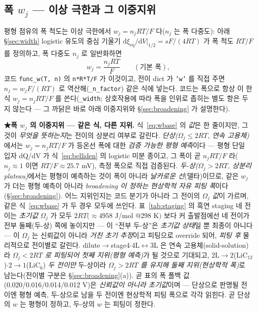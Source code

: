 \documentclass[11pt,a4paper]{article}
\newcommand{\dd}{\mathrm{d}}
\newcommand{\eq}{\mathrm{eq}}
\newcommand{\code}[1]{\texttt{#1}}
\begin{document}
\subsection{폭 $w_j$ — 이상 극한과 그 이중지위}
평형 점유의 폭 척도는 이상 극한에서 $w_j=n_jRT/F$ 다($n_j$ 는 폭 다중도): 아래 \S\ref{sec:width} logistic 유도의
중심 기울기 $\dd\xi_\eq/\dd V|_{1/2}=sF/(4RT)$ 가 폭 척도 $RT/F$ 를 정의하고, 폭 다중도 $n_j$ 로 일반화하면
\begin{equation}
w_j=\frac{n_jRT}{F}\qquad(\text{기본 폭}),
\label{eq:wbase}
\end{equation}
코드 \code{func\_w(T, n)} 의 \code{n*R*T/F}
가 이것이고, 전이 dict 가 \code{'w'} 를 직접 주면 $n_j=w_jF/(RT)$ 로 역산해(\code{\_n\_factor}) 같은 식에 넣는다.
코드는 폭으로 항상 이 한 식 $w_j=n_jRT/F$ 를 쓴다(\code{\_width}; 상호작용에 따라 폭을 인위로 좁히는 별도 항은 두지
않는다 — 그 까닭은 바로 아래 이중지위와 \S\ref{sec:broadening} 가 설명한다).

\textbf{★폭 $w_j$ 의 이중지위 — 같은 식, 다른 지위.} 식~\eqref{eq:wbase} 의 \emph{값}은 한 줄이지만, 그것이
\emph{무엇을 뜻하는지}는 전이의 상분리 여부로 갈린다. \emph{단상($\Omega_j\le2RT$, 연속 고용체)}에서는 $w_j=n_jRT/F$
가 등온선 폭에 대한 \emph{검증 가능한 평형 예측}이다 — 평형 단일 입자 dQ/dV 가 식~\eqref{eq:belliden} 의 logistic
미분 종이고, 그 폭이 곧 $n_jRT/F$ 라($n_j\!\approx\!1$ 이면 $RT/F\!\approx\!25.7$ mV), 측정 폭으로 직접 검증된다.
\emph{두-상($\Omega_j>2RT$, 상분리 plateau)}에서는 평형이 예측하는 것이 폭이 아니라 \emph{날카로운 선}(델타)이므로,
같은 $w_j$ 가 더는 평형 예측이 아니라 \emph{broadening 이 정하는 현상학적 자유 피팅 폭}이다(\S\ref{sec:broadening}).
어느 지위인지는 코드 분기가 아니라 그 전이의 \emph{$\Omega_j$ 값}이 가르며, 같은 식~\eqref{eq:wbase} 가 두 경우 모두에
쓰인다. 표~\ref{tab:staging} 의 흑연 staging 네 전이는 \emph{초기값} $\Omega_j$ 가 모두 $2RT(\!\approx\!4958$ J/mol
$@298$ K$)$ 보다 커 출발점에선 네 전이가 전부 둘째(두-상) 쪽에 놓이지만 — 이 ``전부 두-상''은 \emph{초기값 상태}일 뿐
최종이 아니다 — 이 $\Omega_j$ 는 신뢰값이 아니라 \emph{거친 초기 추정}이고 피팅으로 override 되어, \emph{피팅 후} 물리적으로
전이별로 갈린다. dilute$\to$stage4$\cdot$4L$\leftrightarrow$3L 은
연속 고용체(solid-solution)라 \emph{$\Omega_j<2RT$ 로 피팅되어 첫째 지위(평형 예측)}가 될 것으로 기대되고,
$2\mathrm L\!\to\!2$($\mathrm{LiC_{12}}$)$\cdot$$2\!\to\!1$($\mathrm{LiC_6}$) \emph{두 전이만} 두-상이라
\emph{$\Omega_j>2RT$ 를 유지해 둘째 지위(현상학적 폭)}로 남는다(전이별 구분은 \S\ref{sec:broadening}(a)). 곧 표의 폭 폴백
값(0.020/0.016/0.014/0.012 V)은 \emph{신뢰값이 아니라 초기값}이며 — 단상으로 판명될 전이엔 평형 예측, 두-상으로 남을
두 전이엔 현상학적 피팅 폭으로 각각 읽힌다. 곧 단상의 $w$ 는 평형이 정하고, 두-상의 $w$ 는 피팅이 정한다.
\end{document}
